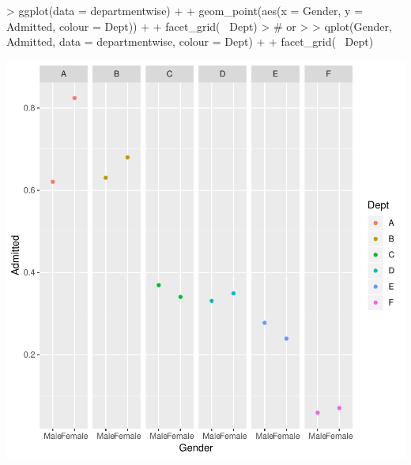 \documentclass[12pt,letterpaper,final]{article}
\begin{document}
\begin{Schunk}
\begin{Sinput}
> ggplot(data = departmentwise) +
+   geom_point(aes(x = Gender, y = Admitted, colour = Dept)) +
+   facet_grid(~ Dept)
> # or
> 
> qplot(Gender, Admitted, data = departmentwise, colour = Dept) +
+   facet_grid(~ Dept)
\end{Sinput}
\end{Schunk}
\includegraphics{lect_main-031}
\end{document}
